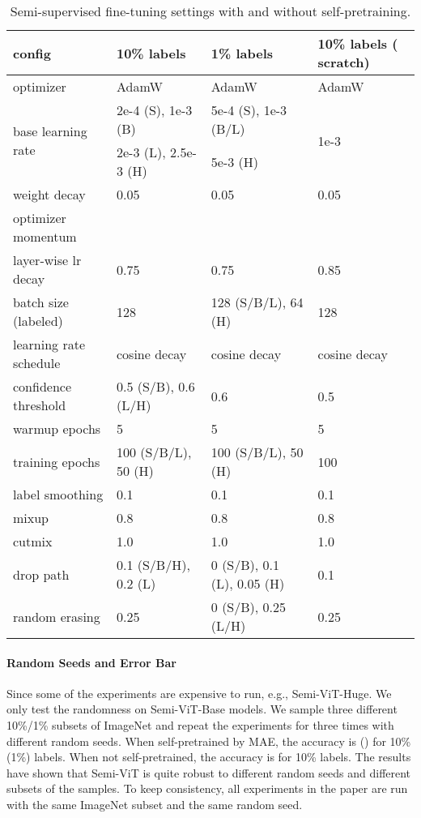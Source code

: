 \documentclass{article}
\begin{document}
\setlength{\tabcolsep}{10pt}
\begin{table}[t]
\begin{center}\small
\begin{tabular}{l|lll}
config & 10\% labels  & 1\% labels & 10\% labels ( scratch) \\
\toprule
optimizer & AdamW & AdamW & AdamW  \\
\multirow{2}{*}{base learning rate} & 2e-4 (S), 1e-3 (B) & 5e-4 (S), 1e-3 (B/L) & \multirow{2}{*}{1e-3} \\
& 2e-3 (L), 2.5e-3 (H) & 5e-3 (H) & \\
weight decay & 0.05 & 0.05 & 0.05 \\
optimizer momentum &  &  &  \\
layer-wise lr decay \cite{bao2021beit} & 0.75 & 0.75 & 0.85 \\
batch size (labeled) & 128 & 128 (S/B/L), 64 (H) & 128 \\
learning rate schedule & cosine decay & cosine decay & cosine decay \\
confidence threshold & 0.5 (S/B), 0.6 (L/H) & 0.6 & 0.5 \\
warmup epochs & 5  & 5 & 5 \\
training epochs & 100 (S/B/L), 50 (H) & 100 (S/B/L), 50 (H) & 100 \\
label smoothing \cite{DBLP:conf/cvpr/SzegedyVISW16} & 0.1 & 0.1 & 0.1 \\
mixup \cite{DBLP:conf/iclr/ZhangCDL18} & 0.8 & 0.8 & 0.8 \\
cutmix \cite{DBLP:conf/iccv/YunHCOYC19} & 1.0 & 1.0 & 1.0 \\
drop path \cite{DBLP:conf/eccv/HuangSLSW16} & 0.1 (S/B/H), 0.2 (L) & 0 (S/B), 0.1 (L), 0.05 (H) & 0.1 \\
random erasing \cite{DBLP:conf/aaai/Zhong0KL020} & 0.25 & 0 (S/B), 0.25 (L/H) & 0.25 \\
\end{tabular}
\caption{Semi-supervised fine-tuning settings with and without self-pretraining.}
\label{tab:impl_ssl}\vspace{-3mm}
\end{center}
\end{table}



\paragraph{Random Seeds and Error Bar}
Since some of the experiments are expensive to run, e.g., Semi-ViT-Huge. We only test the randomness on Semi-ViT-Base models. We sample three different 10\%/1\% subsets of ImageNet and repeat the experiments for three times with different random seeds. When self-pretrained by MAE, the accuracy is  () for 10\% (1\%) labels. When not self-pretrained, the accuracy is  for 10\% labels. The results have shown that Semi-ViT is quite robust to different random seeds and different subsets of the samples. To keep consistency, all experiments in the paper are run with the same ImageNet subset and the same random seed. 
\end{document}
